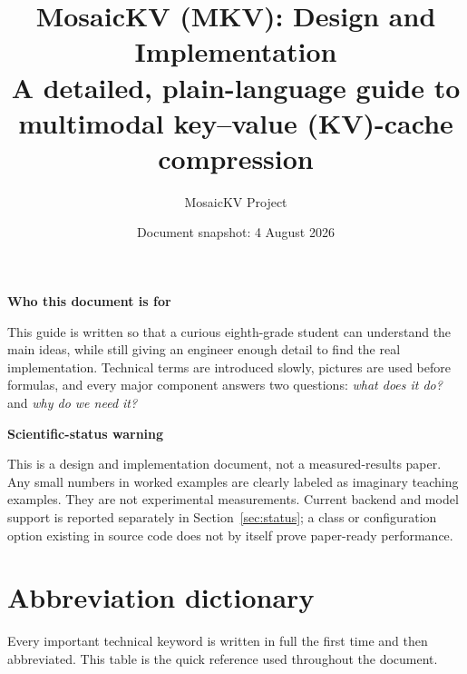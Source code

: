 \documentclass[11pt]{article}
\title{\textbf{MosaicKV (MKV): Design and Implementation}\\
\large A detailed, plain-language guide to multimodal key--value (KV)-cache compression}
\author{MosaicKV Project}
\date{Document snapshot: 4 August 2026}
\newenvironment{plainbox}[1]{%
  \begin{center}\begin{minipage}{0.94\linewidth}
  \colorbox{mklight}{\parbox{0.965\linewidth}{\textbf{#1}\par\smallskip}}
  \vspace{-0.5em}\small
}{%
  \end{minipage}\end{center}
}
\begin{document}
\maketitle

\begin{plainbox}{Who this document is for}
This guide is written so that a curious eighth-grade student can understand the main ideas,
while still giving an engineer enough detail to find the real implementation. Technical terms
are introduced slowly, pictures are used before formulas, and every major component answers two
questions: \emph{what does it do?} and \emph{why do we need it?}
\end{plainbox}

\begin{plainbox}{Scientific-status warning}
This is a design and implementation document, not a measured-results paper. Any small numbers in
worked examples are clearly labeled as imaginary teaching examples. They are not experimental
measurements. Current backend and model support is reported separately in
Section~\ref{sec:status}; a class or configuration option existing in source code does not by
itself prove paper-ready performance.
\end{plainbox}

\tableofcontents
\clearpage

\section*{Abbreviation dictionary}
\label{sec:abbreviations}

Every important technical keyword is written in full the first time and then abbreviated. This
table is the quick reference used throughout the document.
\end{document}
